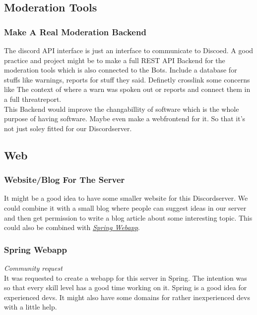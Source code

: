 \documentclass{article}
\newcommand{\refsection}[2]{\hyperref[#1]{\underline{\textit{#2}}}}
\begin{document}
    \subsection{Moderation Tools}

    \subsubsection{Make A Real Moderation Backend}
    The discord API interface is just an interface to communicate to Discoed. 
    A good practice and project might be to make a full REST API Backend for the moderation tools which is also connected to the Bots. 
    Include a database for stuffs like warnings, reports for stuff they said. 
    Definetly crosslink some concerns like The context of where a warn was spoken out or reports and connect them in a full threatreport. \\
    This Backend would improve the changabillity of software which is the whole purpose of having software. 
    Maybe even make a webfrontend for it. So that it's not just soley fitted for our Discordserver.

    \subsection{Web}

    \subsubsection{Website/Blog For The Server}
    It might be a good idea to have some smaller website for this Discordserver. 
    We could combine it with a small blog where people can suggest ideas in our server and then get permission to write a blog article about some interesting topic.
    This could also be combined with \refsection{sec:springwebapp}{Spring Webapp}.

    \subsubsection{Spring Webapp}
    \label{sec:springwebapp}
    \textit{Community request} \\ \newline 
    It was requested to create a webapp for this server in Spring. 
    The intention was so that every skill level has a good time working on it. 
    Spring is a good idea for experienced devs. It might also have some domains for rather inexperienced devs with a little help.
\end{document}
